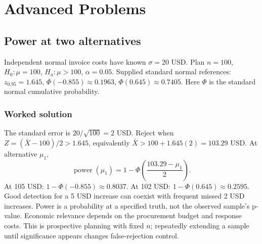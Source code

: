 \section{Advanced Problems}\label{sec:advanced}
\subsection{Power at two alternatives}\label{prob:formula}
Independent normal invoice costs have known $\sigma=20$ USD. Plan $n=100$, $H_0:\mu=100$, $H_a:\mu>100$, $\alpha=0.05$. Supplied standard normal references: $z_{0.95}=1.645$, $\Phi(-0.855)\approx0.1963$, $\Phi(0.645)\approx0.7405$. Here $\Phi$ is the standard normal cumulative probability.
\subsubsection*{Worked solution}\label{sol:formula}
The standard error is $20/\sqrt{100}=2$ USD. Reject when $Z=(\bar X-100)/2>1.645$, equivalently $\bar X>100+1.645(2)=103.29$ USD. At alternative $\mu_1$,
\[
\operatorname{power}(\mu_1)=1-\Phi\left(\frac{103.29-\mu_1}{2}\right).
\]
At 105 USD: $1-\Phi(-0.855)\approx0.8037$. At 102 USD: $1-\Phi(0.645)\approx0.2595$. Good detection for a 5 USD increase can coexist with frequent missed 2 USD increases. Power is a probability at a specified truth, not the observed sample's p-value. Economic relevance depends on the procurement budget and response costs. This is prospective planning with fixed $n$; repeatedly extending a sample until significance appears changes false-rejection control.


